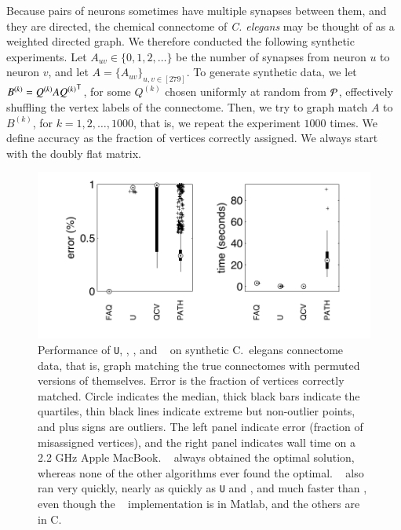 \documentclass[preprint,11pt]{elsarticle}
\begin{document}
Because pairs of neurons sometimes have multiple synapses between them, and they are directed, the chemical connectome of \emph{C. elegans} may be thought of as a weighted directed graph.
We therefore conducted the following synthetic experiments.  
Let $A_{uv} \in \{0,1,2,\ldots\}$ be the number of synapses from neuron $u$ to neuron $v$, and let $A=\{A_{uv}\}_{u,v \in [279]}$.  To generate synthetic data, we let $B^{(k)}=Q^{(k)} A {Q^{(k)}}^{\mathsf{T}}$, for some $Q^{(k)}$ chosen uniformly at random from $\mathcal{P}$, effectively shuffling the vertex labels of the connectome.  Then, we try to graph match $A$ to $B^{(k)}$, for  $k =1,2,\ldots, 1000$, that is, we repeat the experiment $1000$ times.  We define accuracy as the fraction of vertices correctly assigned. We always start with the doubly flat matrix.


\begin{figure}[htbp]
	\centering
		\includegraphics[width=0.7\linewidth]{chemicalConnectome.pdf}
	\caption{Performance of \texttt{U}, \Qcv, \Path, and \FAQ~ on synthetic C.~elegans connectome data, that is, graph matching the true connectomes with permuted versions of themselves.  Error is the fraction of vertices correctly matched.  Circle indicates the median, thick black bars indicate the quartiles, thin black lines indicate extreme but non-outlier points, and plus signs are outliers. The left panel indicate error (fraction of misassigned vertices), and the right panel indicates wall time on a 2.2 GHz Apple MacBook.   \FAQ~ always obtained the optimal solution, whereas none of the other algorithms ever found the optimal.    \FAQ~ also ran very quickly, nearly as quickly as \texttt{U} and \Qcv, and much faster than \Path, even though the \FAQ~ implementation is in Matlab, and the others are in C.}
	\label{fig:connectomes}
\end{figure}
\end{document}
